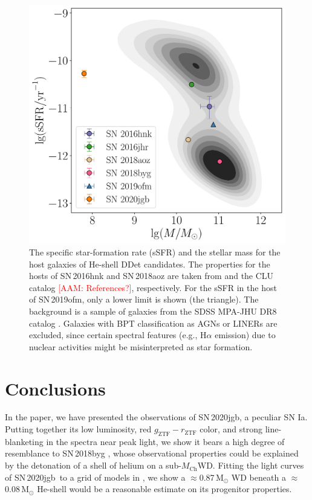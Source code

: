 \documentclass[twocolumn]{aastex631}
\newcommand{\sn}{SN\,2020jgb}
\newcommand{\Mch}{$M_\mathrm{Ch}$}
\newcommand{\adam}[1]{\textcolor{red}{[AAM: #1]}}
\begin{document}
\begin{figure}
    \centering
    \includegraphics[width=\linewidth]{host.pdf}
    \caption{The specific star-formation rate (sSFR) and the stellar mass for the host galaxies of He-shell DDet candidates. The properties for the hosts of SN\,2016hnk and SN\,2018aoz are taken from \citet{Dong_Ca-rich_2022} and the CLU catalog \adam{References?}, respectively. For the sSFR in the host of SN\,2019ofm, only a lower limit is shown (the triangle). The background is a sample of galaxies from the SDSS MPA-JHU DR8 catalog \citep{Kauffmann_SDSS_2003,Brinchmann_SDSS_2004}. Galaxies with BPT classification as AGNs or LINERs are excluded, since certain spectral features (e.g., H$\alpha$ emission) due to nuclear activities might be misinterpreted as star formation.}
    \label{fig:host}
\end{figure}

\section{Conclusions} \label{sec:conclusion}
In the paper, we have presented the observations of \sn, a peculiar SN Ia. Putting together its low luminosity, red $g_\mathrm{ZTF}-r_\mathrm{ZTF}$ color, and strong line-blanketing in the spectra near peak light, we show it bears a high degree of resemblance to SN\,2018byg \citep{de_18byg_2019}, whose observational properties could be explained by the detonation of a shell of helium on a sub-\Mch WD. Fitting the light curves of \sn\ to a grid of models in \citet{polin_observational_2019}, we show a $\approx$0.87\,$\mathrm{M_\odot}$ WD beneath a $\approx$0.08\,$\mathrm{M_\odot}$ He-shell would be a reasonable estimate on its progenitor properties.
\end{document}
